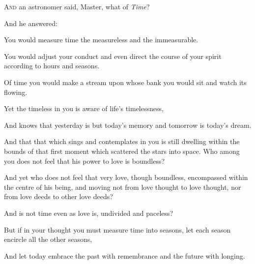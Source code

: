 \lettrine{A}{nd} an astronomer said, Master, what
of \textit{Time}?

\bigskip
And he answered:

You would measure time the measureless
and the immeasurable.

You would adjust your conduct and
even direct the course of your spirit
according to hours and seasons.

Of time you would make a stream upon
whose bank you would sit and watch its
flowing.

Yet the timeless in you is aware of
life's timelessness,

And knows that yesterday is but today’s
memory and tomorrow is today’s dream.

And that that which sings and
contemplates in you is still dwelling
within the bounds of that first moment
which scattered the stars into space.
Who among you does not feel that his
power to love is boundless?

And yet who does not feel that very
love, though boundless, encompassed
within the centre of his being, and
moving not from love thought to love
thought, nor from love deeds to other
love deeds?

And is not time even as love is,
undivided and paceless?



But if in your thought you must measure
time into seasons, let each season
encircle all the other seasons,

And let today embrace the past with
remembrance and the future with longing.
